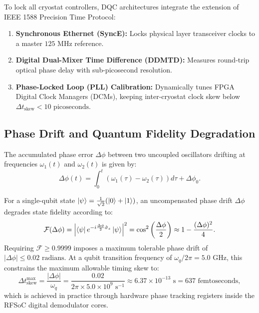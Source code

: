To lock all cryostat controllers, DQC architectures integrate the  extension of IEEE 1588 Precision Time Protocol:
\begin{enumerate}
    \item \textbf{Synchronous Ethernet (SyncE):} Locks physical layer transceiver clocks to a master $125\text{ MHz}$ reference.
    \item \textbf{Digital Dual-Mixer Time Difference (DDMTD):} Measures round-trip optical phase delay with sub-picosecond resolution.
    \item \textbf{Phase-Locked Loop (PLL) Calibration:} Dynamically tunes FPGA Digital Clock Managers (DCMs), keeping inter-cryostat clock skew below $\Delta t_{\text{skew}} < 10\text{ picoseconds}$.
\end{enumerate}

\subsection{Phase Drift and Quantum Fidelity Degradation}
The accumulated phase error $\Delta \phi$ between two uncoupled oscillators drifting at frequencies $\omega_1(t)$ and $\omega_2(t)$ is given by:
\begin{equation}
    \Delta \phi(t) = \int_0^t \left( \omega_1(\tau) - \omega_2(\tau) \right) d\tau + \Delta \phi_0.
    \label{eq:phase_drift_integral}
\end{equation}

For a single-qubit state $\ket{\psi} = \frac{1}{\sqrt{2}}(\ket{0} + \ket{1})$, an uncompensated phase drift $\Delta \phi$ degrades state fidelity according to:
\begin{equation}
    \mathcal{F}(\Delta \phi) = \left| \bra{\psi} e^{-i \frac{\Delta \phi}{2} \hat{\sigma}_z} \ket{\psi} \right|^2 = \cos^2\left(\frac{\Delta \phi}{2}\right) \approx 1 - \frac{(\Delta \phi)^2}{4}.
    \label{eq:fidelity_vs_phase_drift}
\end{equation}
Requiring $\mathcal{F} \ge 0.9999$ imposes a maximum tolerable phase drift of $|\Delta \phi| \le 0.02\text{ radians}$. At a qubit transition frequency of $\omega_q / 2\pi = 5.0\text{ GHz}$, this constrains the maximum allowable timing skew to:
\begin{equation}
    \Delta t_{\text{skew}}^{\text{max}} = \frac{|\Delta \phi|}{\omega_q} = \frac{0.02}{2\pi \times 5.0 \times 10^9\text{ s}^{-1}} \approx 6.37 \times 10^{-13}\text{ s} = 637\text{ femtoseconds},
    \label{eq:sub_picosecond_timing_bound}
\end{equation}
which is achieved in practice through hardware phase tracking registers inside the RFSoC digital demodulator cores.

